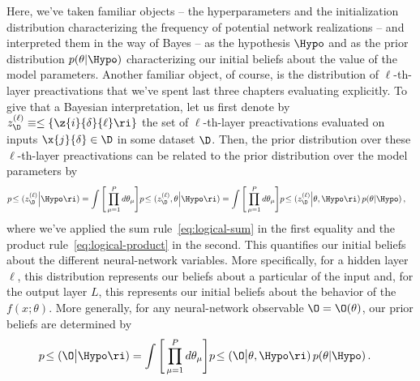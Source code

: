 Here, we've taken familiar objects -- the hyperparameters and the initialization distribution characterizing the frequency of potential network realizations -- and interpreted them in the way of Bayes -- as the hypothesis $\Hypo$ and as the prior distribution $p(\theta \vert\Hypo)$ characterizing our initial beliefs
about the value of the model parameters.
Another familiar object, of course, is the distribution of
$\ell$-th-layer
preactivations that we've spent last three chapters evaluating explicitly.
To give that a Bayesian interpretation, let us first denote by $z^{(\ell)}_{\D}\equiv\le\{\z{i}{\delta}{\ell}\ri\}$ the set of $\ell$-th-layer preactivations
evaluated on inputs $\x{j}{\delta}\in\D$ in some dataset $\D$.
Then, the prior distribution over these $\ell$-th-layer preactivations can be related to the prior distribution over the model parameters by
\begin{align}\label{eq:gigantic-beast-that-we-tame-reprint}
p\!\le(z^{(\ell)}_{\D} \Big| \Hypo \ri) &= \int \Bigg[  \prod_{\mu=1}^{P} d \theta_{\mu}\Bigg] p\!\le(z^{(\ell)}_{\D}, \theta\Big\vert \Hypo \ri)=\int \Bigg[\prod_{\mu=1}^{P} d \theta_{\mu}\Bigg] p\!\le(z^{(\ell)}_{\D} \Big|\theta, \Hypo \ri)\, p(\theta| \Hypo)\, ,
\end{align}
where we've applied the sum rule~\eqref{eq:logical-sum} in the first equality and the product rule~\eqref{eq:logical-product} in the second. 
This 
quantifies our initial beliefs about the different neural-network variables.
More specifically, for a hidden layer $\ell$, this distribution represents our beliefs about a particular   of the input
and, for the output layer $L$, this represents our initial beliefs about 
the behavior of 
the 
 $f(x; \theta)$.
More generally, for any neural-network observable $\O=\O(\theta)$, our prior beliefs are determined by
\begin{align}\label{eq:prior-observable-predition}
p\!\le(\O \big| \Hypo \ri) &=\int \Bigg[\prod_{\mu=1}^{P} d \theta_{\mu}\Bigg] p\!\le(\O \big|\theta, \Hypo \ri)\, p(\theta| \Hypo)\, .
\end{align}

